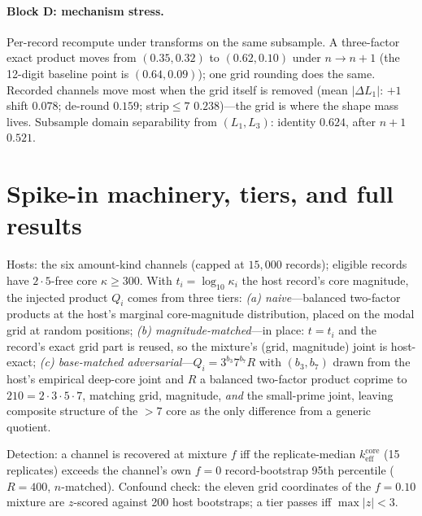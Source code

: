 \documentclass[12pt]{article}
\newcommand{\keff}{k_{\mathrm{eff}}}
\begin{document}
\paragraph{Block D: mechanism stress.}
Per-record recompute under transforms on the same subsample. A three-factor
exact product moves from $(0.35, 0.32)$ to $(0.62, 0.10)$ under $n \to n{+}1$
(the 12-digit baseline point is $(0.64, 0.09)$); one grid rounding does the
same. Recorded channels move most when the grid itself is removed (mean
$|\Delta L_1|$: $+1$ shift $0.078$; de-round $0.159$; strip$\le7$
$0.238$)---the grid is where the shape mass lives. Subsample domain
separability from $(L_1, L_3)$: identity $0.624$, after $n{+}1$ $0.521$.

\section{Spike-in machinery, tiers, and full results}
\label{s:spikein}

Hosts: the six amount-kind channels (capped at $15{,}000$ records); eligible
records have $2\cdot5$-free core $\kappa \ge 300$. With $t_i = \log_{10}
\kappa_i$ the host record's core magnitude, the injected product $Q_i$ comes
from three tiers: \emph{(a) naive}---balanced two-factor products at the
host's marginal core-magnitude distribution, placed on the modal grid at
random positions; \emph{(b) magnitude-matched}---in place: $t = t_i$ and the
record's exact grid part is reused, so the mixture's (grid, magnitude) joint
is host-exact; \emph{(c) base-matched adversarial}---$Q_i = 3^{b_3} 7^{b_7}
R$ with $(b_3, b_7)$ drawn from the host's empirical deep-core joint and $R$ a
balanced two-factor product coprime to $210 = 2\cdot3\cdot5\cdot7$,
matching grid, magnitude,
\emph{and} the small-prime joint, leaving composite structure of the $>7$ core
as the only difference from a generic quotient.

Detection: a channel is recovered at mixture $f$ iff the replicate-median
$\keff^{\mathrm{core}}$ (15 replicates) exceeds the channel's own $f{=}0$
record-bootstrap 95th percentile ($R = 400$, $n$-matched). Confound check: the
eleven grid coordinates of the $f = 0.10$ mixture are $z$-scored against 200
host bootstraps; a tier passes iff $\max|z| < 3$.
\end{document}
